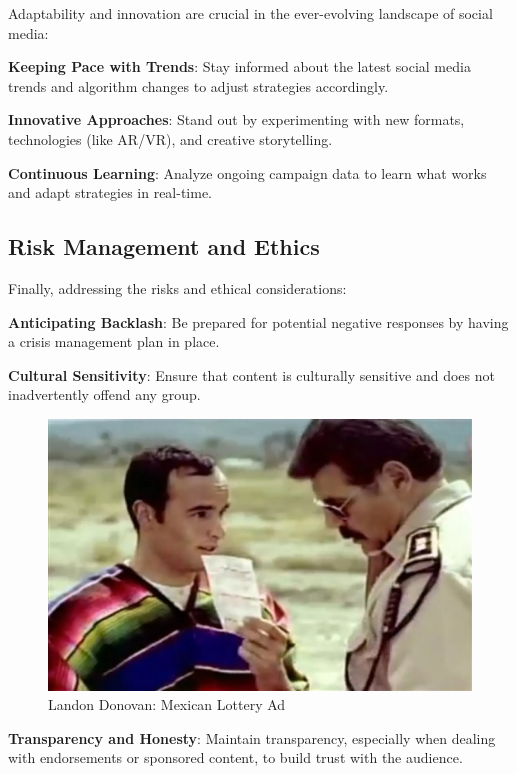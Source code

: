 \documentclass[
]{book}
\begin{document}
Adaptability and innovation are crucial in the ever-evolving landscape of social media:

\textbf{Keeping Pace with Trends}: Stay informed about the latest social media trends and algorithm changes to adjust strategies accordingly.

\textbf{Innovative Approaches}: Stand out by experimenting with new formats, technologies (like AR/VR), and creative storytelling.

\textbf{Continuous Learning}: Analyze ongoing campaign data to learn what works and adapt strategies in real-time.

\hypertarget{risk-management-and-ethics}{%
\subsection{Risk Management and Ethics}\label{risk-management-and-ethics}}

Finally, addressing the risks and ethical considerations:

\textbf{Anticipating Backlash}: Be prepared for potential negative responses by having a crisis management plan in place.

\textbf{Cultural Sensitivity}: Ensure that content is culturally sensitive and does not inadvertently offend any group.

\begin{figure}
\centering
\includegraphics[width=1\textwidth,height=\textheight]{images/lottery-mexico.jpg}
\caption{Landon Donovan: Mexican Lottery Ad}
\end{figure}

\textbf{Transparency and Honesty}: Maintain transparency, especially when dealing with endorsements or sponsored content, to build trust with the audience.
\end{document}
